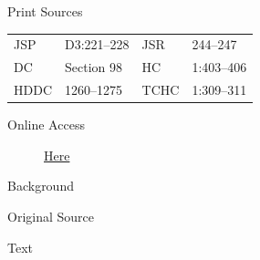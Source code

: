 			\begin{description}
				\item[Print Sources]
			\end{description}

				\begin{tabular}{p{0.5in}p{1in}p{0.5in}p{1in}}
				JSP	 	& D3:221--228		& JSR 		& 244--247 \\
				DC	 	& Section 98 		& HC 		& 1:403--406 \\
				HDDC 	& 1260--1275		& TCHC 		& 1:309--311 \\
				\end{tabular}
			
			\begin{description}
				\item[Online Access] \href{https://www.josephsmithpapers.org/paper-summary/revelation-6-august-1833-dc-98/1}{Here}
			\end{description}
			
			\begin{description}
				\item[Background]
			\end{description}
			
			
			\begin{description}
				\item[Original Source]
			\end{description}
			
			
			\begin{description}
				\item[Text]
			\end{description}
			
